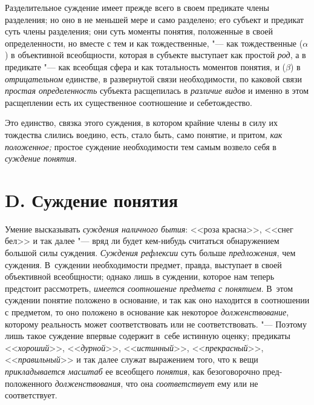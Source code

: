 Разделительное суждение имеет прежде всего в своем предикате
члены разделения; но оно в не меньшей мере и само разделено; его субъект и
предикат суть члены разделения; они суть моменты понятия, положенные в
своей определенности, но вместе с тем и как тождественные, "---
как тождественные ($\alpha $) в объективной всеобщности,
которая в субъекте выступает как простой
{\em род}, а в предикате
"--- как всеобщая сфера и как тотальность моментов понятия, и
($\beta $) в {\em отрицательном}
единстве, в развернутой связи необходимости, по каковой связи
{\em простая определенность}
субъекта расщепилась в
{\em различие видов} и
именно в этом расщеплении есть их существенное соотношение и
себетождество.

Это единство, связка этого суждения, в котором крайние члены в
силу их тождества слились воедино, есть, стало быть, само понятие, и
притом, {\em как положенное;}
простое суждение необходимости тем самым возвело себя в
{\em суждение понятия}.

\section[D. Суждение понятия]{D. Суждение понятия}
Умение высказывать
{\em суждения наличного бытия}:
<<роза красна>>, <<снег бел>> и так далее "--- вряд
ли будет кем-нибудь считаться обнаружением большой силы суждения.
{\em Суждения рефлексии}
суть больше
{\em предложения}, чем
суждения. В~суждении необходимости предмет, правда,
выступает в своей объективной всеобщности; однако лишь в суждении, которое
нам теперь предстоит рассмотреть,
{\em имеется соотношение предмета с
понятием}. В~этом суждении понятие положено в основание, и
так как оно находится в соотношении с предметом, то оно положено в
основание как некоторое
{\em долженствование},
которому реальность может соответствовать или не
соответствовать. "--- Поэтому лишь такое суждение впервые
содержит в~себе истинную оценку; предикаты
<<{\em хороший}>>,
<<{\em дурной}>>,
<<{\em истинный}>>,
<<{\em прекрасный}>>,
<<{\em правильный}>> и так
далее служат выражением того, что к вещи
{\em прикладывается масштаб} ее всеобщего
{\em понятия}, как
безоговорочно пред-положенного
{\em долженствования},
что она
{\em соответствует} ему
или не соответствует.

